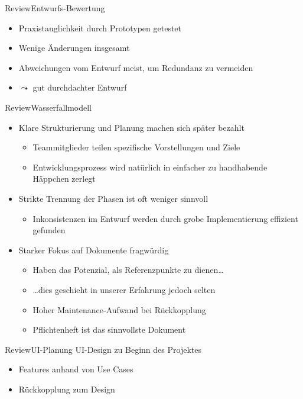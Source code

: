 \documentclass[10pt]{beamer}
\begin{document}
\begin{frame}{Review}{Entwurfs-Bewertung}
	\begin{itemize}
		\item Praxistauglichkeit durch Prototypen getestet
		\item Wenige Änderungen insgesamt
		\item Abweichungen vom Entwurf meist, um Redundanz zu vermeiden
		\item [] $\leadsto$ gut durchdachter Entwurf
	\end{itemize}
\end{frame}

\begin{frame}{Review}{Wasserfallmodell}
	\begin{itemize}
		\item Klare Strukturierung und Planung machen sich später bezahlt
			\begin{itemize}
				\item Teammitglieder teilen spezifische Vorstellungen und Ziele
				\item Entwicklungsprozess wird natürlich in einfacher zu handhabende
					Häppchen zerlegt
			\end{itemize}
		\item Strikte Trennung der Phasen ist oft weniger sinnvoll
			\begin{itemize}
				\item Inkonsistenzen im Entwurf werden durch grobe Implementierung
					effizient gefunden
			\end{itemize}
		\item Starker Fokus auf Dokumente fragwürdig
			\begin{itemize}
				\item Haben das Potenzial, als Referenzpunkte zu dienen\ldots
				\item \ldots dies geschieht in unserer Erfahrung jedoch selten
				\item Hoher Maintenance-Aufwand bei Rückkopplung
				\item Pflichtenheft ist das sinnvollste Dokument
			\end{itemize}
	\end{itemize}
\end{frame}

\begin{frame}{Review}{UI-Planung}
UI-Design zu Beginn des Projektes
	\begin{itemize}
		\item Features anhand von Use Cases
		\item Rückkopplung zum Design
	\end{itemize}
\end{frame}
\end{document}
